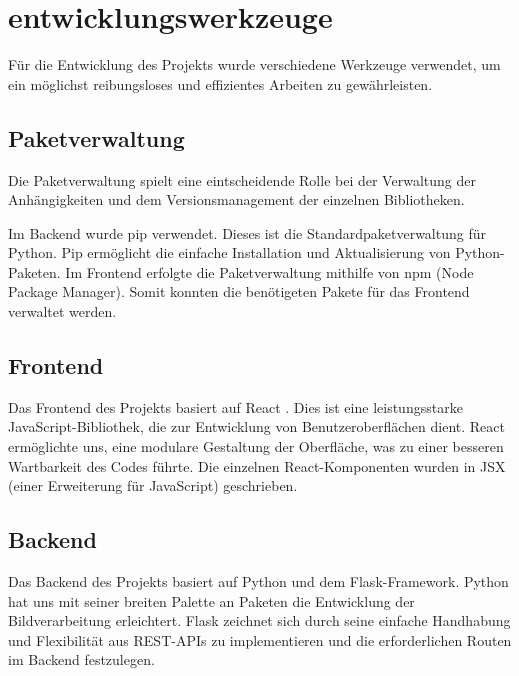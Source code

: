 \section{entwicklungswerkzeuge}
Für die Entwicklung des Projekts wurde verschiedene Werkzeuge verwendet, um ein möglichst reibungsloses und effizientes Arbeiten zu gewährleisten.

\subsection{Paketverwaltung}
Die Paketverwaltung spielt eine eintscheidende Rolle bei der Verwaltung der Anhängigkeiten und dem Versionsmanagement der einzelnen Bibliotheken.

Im Backend wurde \glqq{}pip\grqq{} verwendet. Dieses ist die Standardpaketverwaltung für Python. \glqq{}Pip\grqq{} ermöglicht die einfache Installation und Aktualisierung von Python-Paketen. Im Frontend erfolgte die Paketverwaltung mithilfe von  \glqq{}npm\grqq{} (Node Package Manager). Somit konnten die benötigeten Pakete für das Frontend verwaltet werden.

\subsection{Frontend}
Das Frontend des Projekts basiert auf React \cite{react}. Dies ist eine leistungsstarke JavaScript-Bibliothek, die zur Entwicklung von Benutzeroberflächen dient. React ermöglichte uns, eine modulare Gestaltung der Oberfläche, was zu einer besseren Wartbarkeit des Codes führte. Die einzelnen React-Komponenten wurden in JSX (einer Erweiterung für JavaScript) geschrieben. 

\subsection{Backend}
Das Backend des Projekts basiert auf Python und dem Flask-Framework. Python hat uns mit seiner breiten Palette an Paketen die Entwicklung der Bildverarbeitung erleichtert. Flask zeichnet sich durch seine einfache Handhabung und Flexibilität aus REST-APIs zu implementieren und die erforderlichen Routen im Backend festzulegen.